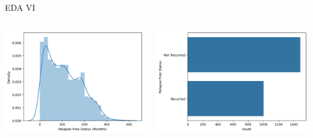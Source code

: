 \documentclass{beamer}
\begin{document}
\begin{frame}{EDA VI}
\begin{columns}
    \begin{column}{0.49 \textwidth}
        \centering
        \includegraphics[width = \textwidth]{images/relapse_m.png}
    \end{column}
    \begin{column}{0.49 \textwidth}
        \centering
        \includegraphics[width = \textwidth]{images/relapse_s.png}
    \end{column}
\end{columns}
\end{frame}
\end{document}
